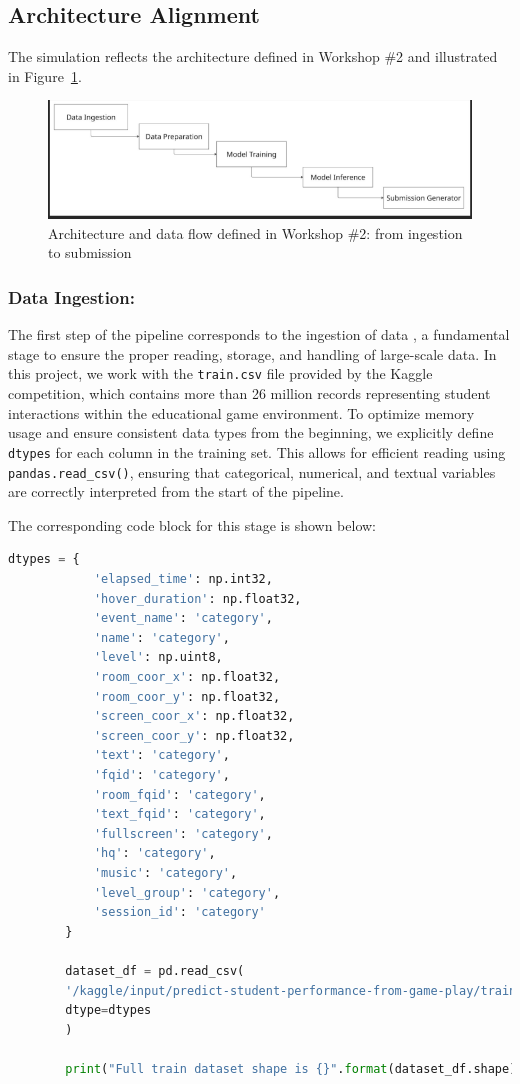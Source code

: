 \documentclass[12pt]{article}
\begin{document}
	\subsection{Architecture Alignment}
	The simulation reflects the architecture defined in Workshop \#2 and illustrated in Figure~\ref{fig:pipeline}.

    \begin{figure}[H]
        \centering
        \includegraphics[width=0.9\linewidth]{src/pipeline.png}
        \caption{Architecture and data flow defined in Workshop \#2: from ingestion to submission}
        \label{fig:pipeline}
    \end{figure}

	
	\subsubsection{Data Ingestion:}
	The first step of the pipeline corresponds to the ingestion of data \textbf{}, a fundamental stage to ensure the proper reading, storage, and handling of large-scale data. In this project, we work with the \texttt{train.csv} file provided by the Kaggle competition, which contains more than 26 million records representing student interactions within the educational game environment.
	To optimize memory usage and ensure consistent data types from the beginning, we explicitly define \texttt{ dtypes} for each column in the training set. This allows for efficient reading using \texttt{pandas.read\_csv()}, ensuring that categorical, numerical, and textual variables are correctly interpreted from the start of the pipeline.
	
	The corresponding code block for this stage is shown below:
	
	\begin{lstlisting}[language=Python, caption=Explicit Data Typing and Ingestion, basicstyle=\ttfamily\small]
		dtypes = {
			'elapsed_time': np.int32,
			'hover_duration': np.float32,
			'event_name': 'category',
			'name': 'category',
			'level': np.uint8,
			'room_coor_x': np.float32,
			'room_coor_y': np.float32,
			'screen_coor_x': np.float32,
			'screen_coor_y': np.float32,
			'text': 'category',
			'fqid': 'category',
			'room_fqid': 'category',
			'text_fqid': 'category',
			'fullscreen': 'category',
			'hq': 'category',
			'music': 'category',
			'level_group': 'category',
			'session_id': 'category'
		}
		
		dataset_df = pd.read_csv(
		'/kaggle/input/predict-student-performance-from-game-play/train.csv',
		dtype=dtypes
		)
		
		print("Full train dataset shape is {}".format(dataset_df.shape))
	\end{lstlisting}
	
\end{document}
